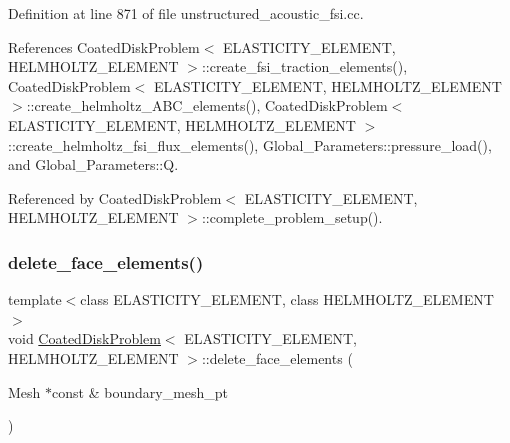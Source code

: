 Definition at line 871 of file unstructured\+\_\+acoustic\+\_\+fsi.\+cc.



References Coated\+Disk\+Problem$<$ E\+L\+A\+S\+T\+I\+C\+I\+T\+Y\+\_\+\+E\+L\+E\+M\+E\+N\+T, H\+E\+L\+M\+H\+O\+L\+T\+Z\+\_\+\+E\+L\+E\+M\+E\+N\+T $>$\+::create\+\_\+fsi\+\_\+traction\+\_\+elements(), Coated\+Disk\+Problem$<$ E\+L\+A\+S\+T\+I\+C\+I\+T\+Y\+\_\+\+E\+L\+E\+M\+E\+N\+T, H\+E\+L\+M\+H\+O\+L\+T\+Z\+\_\+\+E\+L\+E\+M\+E\+N\+T $>$\+::create\+\_\+helmholtz\+\_\+\+A\+B\+C\+\_\+elements(), Coated\+Disk\+Problem$<$ E\+L\+A\+S\+T\+I\+C\+I\+T\+Y\+\_\+\+E\+L\+E\+M\+E\+N\+T, H\+E\+L\+M\+H\+O\+L\+T\+Z\+\_\+\+E\+L\+E\+M\+E\+N\+T $>$\+::create\+\_\+helmholtz\+\_\+fsi\+\_\+flux\+\_\+elements(), Global\+\_\+\+Parameters\+::pressure\+\_\+load(), and Global\+\_\+\+Parameters\+::Q.



Referenced by Coated\+Disk\+Problem$<$ E\+L\+A\+S\+T\+I\+C\+I\+T\+Y\+\_\+\+E\+L\+E\+M\+E\+N\+T, H\+E\+L\+M\+H\+O\+L\+T\+Z\+\_\+\+E\+L\+E\+M\+E\+N\+T $>$\+::complete\+\_\+problem\+\_\+setup().

\mbox{\label{classCoatedDiskProblem_a55b4cead41e01ab5fd728b607f62bb74}} 
\subsubsection{\texorpdfstring{delete\+\_\+face\+\_\+elements()}{delete\_face\_elements()}\hspace{0.1cm}{\footnotesize\ttfamily [1/2]}}
{\footnotesize\ttfamily template$<$class E\+L\+A\+S\+T\+I\+C\+I\+T\+Y\+\_\+\+E\+L\+E\+M\+E\+NT, class H\+E\+L\+M\+H\+O\+L\+T\+Z\+\_\+\+E\+L\+E\+M\+E\+NT$>$ \\
void \hyperlink{classCoatedDiskProblem}{Coated\+Disk\+Problem}$<$ E\+L\+A\+S\+T\+I\+C\+I\+T\+Y\+\_\+\+E\+L\+E\+M\+E\+NT, H\+E\+L\+M\+H\+O\+L\+T\+Z\+\_\+\+E\+L\+E\+M\+E\+NT $>$\+::delete\+\_\+face\+\_\+elements (\begin{DoxyParamCaption}\item[{Mesh $\ast$const \&}]{boundary\+\_\+mesh\+\_\+pt }\end{DoxyParamCaption})\hspace{0.3cm}{\ttfamily [private]}}




